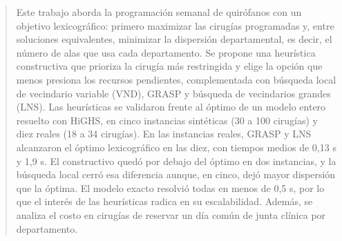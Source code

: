 \begin{abstract}
Este trabajo aborda la programación semanal de quirófanos con un objetivo lexicográfico: primero maximizar las cirugías programadas y, entre soluciones equivalentes, minimizar la dispersión departamental, es decir, el número de alas que usa cada departamento. Se propone una heurística constructiva que prioriza la cirugía más restringida y elige la opción que menos presiona los recursos pendientes, complementada con búsqueda local de vecindario variable (VND), GRASP y búsqueda de vecindarios grandes (LNS). Las heurísticas se validaron frente al óptimo de un modelo entero resuelto con HiGHS, en cinco instancias sintéticas (30 a 100 cirugías) y diez reales (18 a 34 cirugías). En las instancias reales, GRASP y LNS alcanzaron el óptimo lexicográfico en las diez, con tiempos medios de 0,13 s y 1,9 s. El constructivo quedó por debajo del óptimo en dos instancias, y la búsqueda local cerró esa diferencia aunque, en cinco, dejó mayor dispersión que la óptima. El modelo exacto resolvió todas en menos de 0,5 s, por lo que el interés de las heurísticas radica en su escalabilidad. Además, se analiza el costo en cirugías de reservar un día común de junta clínica por departamento.
\end{abstract}
